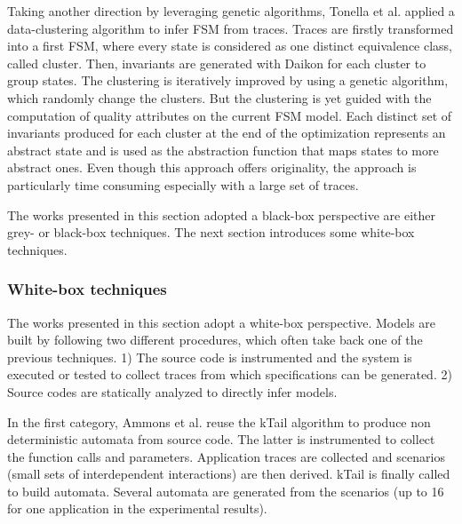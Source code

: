 Taking another direction by leveraging genetic algorithms,
Tonella et al. \cite{TonellaNMLH13} applied a data-clustering
algorithm to infer FSM from traces. Traces are firstly transformed into a first FSM, where every state is considered as one distinct equivalence class, called cluster. Then, invariants are generated with Daikon for each cluster to group states. The clustering is  iteratively improved by using a genetic algorithm, which randomly change the clusters. But the clustering is yet guided with the computation of quality attributes on the current FSM model. Each distinct set of
invariants produced for each cluster at the end of the
optimization represents an abstract state and is used as the
abstraction function that maps states to more abstract ones. Even though this approach offers originality, the approach is particularly time consuming especially with a large set of traces.



The works presented in this section  adopted a black-box perspective are either grey- or black-box
techniques. The next section introduces some white-box techniques.


\subsubsection{White-box techniques}
\label{sec:passive-white}

The works presented in this section adopt a white-box perspective. Models are built by following two different procedures, which often take back one of the previous techniques. 1) The source code is instrumented and the system is executed or tested to collect traces from which specifications can be generated. 2) Source codes are statically analyzed to  directly infer models.

In the first category, Ammons et al. reuse the kTail algorithm to produce non deterministic automata from source code. The latter is instrumented to collect the function calls and parameters. Application traces are collected and  scenarios (small sets of interdependent interactions) are then derived. kTail is finally called to build automata. Several automata are generated from the scenarios (up to 16 for one application in the experimental results).

